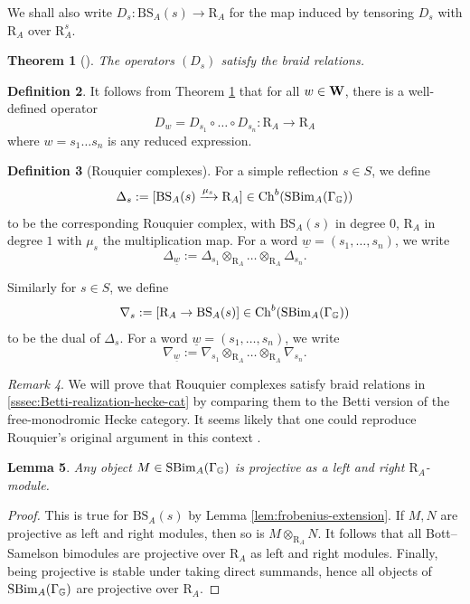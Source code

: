 \documentclass[a4paper, 10pt, oneside, reqno]{amsart}
\theoremstyle{plain}
\newtheorem{thm}{Theorem}[subsection]
\newtheorem{lem}[thm]{Lemma}
\theoremstyle{definition}
\newtheorem{defi}[thm]{Definition}
\theoremstyle{remark}
\newtheorem{rque}[thm]{Remark}
\newcommand{\Gbb}{\mathbb{G}}
\newcommand{\RR}{\mathrm{R}}
\newcommand{\BS}{\mathrm{BS}}
\begin{document}
We shall also write $D_s : \BS_A(s) \to \RR_A$ for the map induced by tensoring $D_s$ with $\RR_A$ over $\RR_A^s$.

\begin{thm}[]\label{thm:braid-relations-Demazure-operators}
The operators $(D_s)$ satisfy the braid relations.
\end{thm}

\begin{defi}\label{defi:demazure-operator-general}
It follows from Theorem \ref{thm:braid-relations-Demazure-operators} that for all $w \in \mathbf{W}$, there is a well-defined operator 
$$D_w = D_{s_1} \circ \dots \circ D_{s_n} : \RR_A \to \RR_A$$
where $w = s_1\dots s_n$ is any reduced expression. 
\end{defi}

\begin{defi}[Rouquier complexes]
For a simple reflection $s \in S$, we define 
$$\Delta_s := [\BS_A(s) \xrightarrow{\mu_s}\RR_A] \in \Ch^b(\SBim_A(\Gamma_{\Gbb}))$$
to be the corresponding Rouquier complex, with $\BS_A(s)$ in degree $0$, $\RR_A$ in degree $1$ with $\mu_s$ the multiplication map. For a word $\underline{w} = (s_1, \dots, s_n)$, we write 
$$\Delta_{\underline{w}} := \Delta_{s_1} \otimes_{\RR_A} \dots \otimes_{\RR_A} \Delta_{s_n}.$$

Similarly for $s \in S$, we define 
$$\nabla_s := [\RR_A \to \BS_A(s)] \in \Ch^b(\SBim_A(\Gamma_{\Gbb}))$$
to be the dual of $\Delta_s$. For a word $\underline{w} = (s_1, \dots, s_n)$, we write 
$$\nabla_{\underline{w}} := \nabla_{s_1} \otimes_{\RR_A} \dots \otimes_{\RR_A} \nabla_{s_n}.$$
\end{defi}

\begin{rque}
We will prove that Rouquier complexes satisfy braid relations in \ref{sssec:Betti-realization-hecke-cat} by comparing them to the Betti version of the free-monodromic Hecke category. It seems likely that one could reproduce Rouquier's original argument in this context \cite{RouquierCategorification}. 
\end{rque} 

\begin{lem}\label{lem:projectivity-over-rr}
Any object $M \in \SBim_A(\Gamma_{\Gbb})$ is projective as a left and right $\RR_A$-module. 
\end{lem}

\begin{proof}
This is true for $\BS_A(s)$ by Lemma \ref{lem:frobenius-extension}. If $M,N$ are projective as left and right modules, then so is $M \otimes_{\RR_A} N$. It follows that all Bott--Samelson bimodules are projective over $\RR_A$ as left and right modules. Finally, being projective is stable under taking direct summands, hence all objects of $\SBim_A(\Gamma_{\Gbb})$ are projective over $\RR_A$.
\end{proof}
\end{document}
